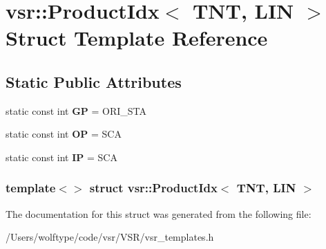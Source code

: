 \hypertarget{structvsr_1_1_product_idx_3_01_t_n_t_00_01_l_i_n_01_4}{\section{vsr\-:\-:Product\-Idx$<$ T\-N\-T, L\-I\-N $>$ Struct Template Reference}
\label{structvsr_1_1_product_idx_3_01_t_n_t_00_01_l_i_n_01_4}
}
\subsection*{Static Public Attributes}
\begin{DoxyCompactItemize}
\item 
\hypertarget{structvsr_1_1_product_idx_3_01_t_n_t_00_01_l_i_n_01_4_a3ac30123d6cd568f7aae67e2bee5b8a3}{static const int {\bfseries G\-P} = O\-R\-I\-\_\-\-S\-T\-A}\label{structvsr_1_1_product_idx_3_01_t_n_t_00_01_l_i_n_01_4_a3ac30123d6cd568f7aae67e2bee5b8a3}

\item 
\hypertarget{structvsr_1_1_product_idx_3_01_t_n_t_00_01_l_i_n_01_4_a6b94143a65d52b7983b8249e640c268c}{static const int {\bfseries O\-P} = S\-C\-A}\label{structvsr_1_1_product_idx_3_01_t_n_t_00_01_l_i_n_01_4_a6b94143a65d52b7983b8249e640c268c}

\item 
\hypertarget{structvsr_1_1_product_idx_3_01_t_n_t_00_01_l_i_n_01_4_a8a8c1c1b7f0dc2cc48a64a3aaf54ce18}{static const int {\bfseries I\-P} = S\-C\-A}\label{structvsr_1_1_product_idx_3_01_t_n_t_00_01_l_i_n_01_4_a8a8c1c1b7f0dc2cc48a64a3aaf54ce18}

\end{DoxyCompactItemize}
\subsubsection*{template$<$$>$ struct vsr\-::\-Product\-Idx$<$ T\-N\-T, L\-I\-N $>$}



The documentation for this struct was generated from the following file\-:\begin{DoxyCompactItemize}
\item 
/\-Users/wolftype/code/vsr/\-V\-S\-R/vsr\-\_\-templates.\-h\end{DoxyCompactItemize}
